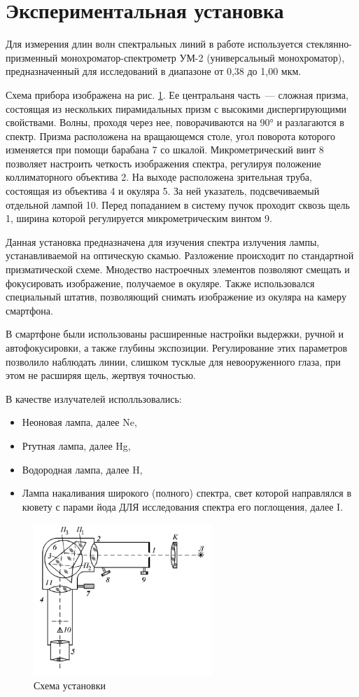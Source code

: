 \section{Экспериментальная установка}
Для измерения длин волн спектральных линий в работе используется стеклянно-призменный монохроматор-спектрометр УМ-2 (универсальный монохроматор), предназначенный для исследований в диапазоне от 0,38 до 1,00 мкм.

Схема прибора изображена на рис. \ref{fig:scheme}. Ее центральаня часть~--- сложная призма, состоящая из нескольких пирамидальных призм с высокими диспергирующими свойствами. Волны, проходя через нее, поворачиваются на 90° и разлагаются в спектр. Призма расположена на вращающемся столе, угол поворота которого изменяется при помощи барабана 7 со шкалой. Микрометрический винт 8 позволяет настроить четкость изображения спектра, регулируя положение коллиматорного объектива 2. На выходе расположена зрительная труба, состоящая из объектива 4 и окуляра 5. За ней указатель, подсвечиваемый отдельной лампой 10. Перед попаданием в систему пучок проходит сквозь щель 1, ширина которой регулируется микрометрическим винтом 9.

Данная установка предназначена для изучения спектра излучения лампы, устанавливаемой на оптическую скамью. Разложение происходит по стандартной призматической схеме. Мнодество настроечных элементов позволяют смещать и фокусировать изображение, получаемое в окуляре. Также использовался специальный штатив, позволяющий снимать изображение из окуляра на камеру смартфона. 

В смартфоне были использованы расширенные настройки выдержки, ручной и автофокусировки, а также глубины экспозиции. Регулирование этих параметров позволило наблюдать линии, слишком тусклые для невооруженного глаза, при этом не расширяя щель, жертвуя точностью. 

В качестве излучателей исполльзовались:
\begin{itemize}
    \item Неоновая лампа, далее Ne,
    \item Ртутная лампа, далее Hg,
    \item Водородная лампа, далее H,
    \item Лампа накаливания широкого (полного) спектра, свет которой направлялся в кювету с парами йода ДЛЯ исследования спектра его поглощения, далее I.
\end{itemize}

\begin{figure}[H]
    \centering
    \includegraphics[width=0.6\textwidth]{img/scheme.png}
    \caption{Схема установки}
    \label{fig:scheme}
\end{figure}